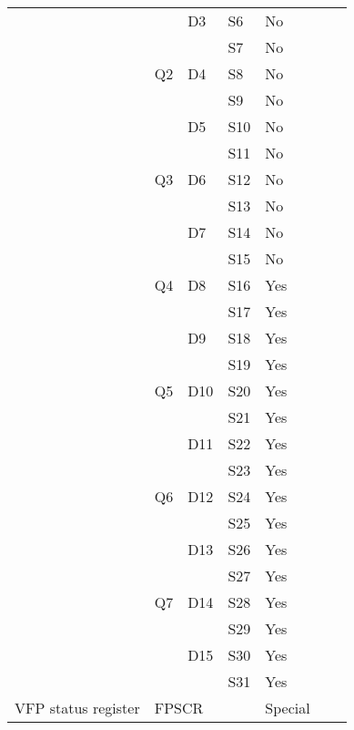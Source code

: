 \begin{tabular}{lllllll}
									&		&	D3	&	S6			&	No			&	  		\\
									&		&		&	S7			&	No			&	  		\\
									&	Q2	&	D4	&	S8			&	No			&	  		\\
									&		&		&	S9			&	No			&	  		\\
									&		&	D5	&	S10			&	No			&	  		\\
									&		&		&	S11			&	No			&	  		\\
									&	Q3	&	D6	&	S12			&	No			&	  		\\
									&		&		&	S13			&	No			&	  		\\
									&		&	D7	&	S14			&	No			&	  		\\
									&		&		&	S15			&	No			&	  		\\
									&	Q4	&	D8	&	S16			&	Yes			&	  		\\
									&		&		&	S17			&	Yes			&	  		\\
									&		&	D9	&	S18			&	Yes			&	  		\\
									&		&		&	S19			&	Yes			&	  		\\
									&	Q5	&	D10	&	S20			&	Yes			&	  		\\
									&		&		&	S21			&	Yes			&	  		\\
									&		&	D11	&	S22			&	Yes			&	  		\\
									&		&		&	S23			&	Yes			&	  		\\
									&	Q6	&	D12	&	S24			&	Yes			&	  		\\
									&		&		&	S25			&	Yes			&	  		\\
									&		&	D13	&	S26			&	Yes			&	  		\\
									&		&		&	S27			&	Yes			&	  		\\
									&	Q7	&	D14	&	S28			&	Yes			&	  		\\
									&		&		&	S29			&	Yes			&	  		\\
									&		&	D15	&	S30			&	Yes			&	  		\\
									&		&		&	S31			&	Yes			&	  		\\
		VFP status register			&	\multicolumn{3}{l}{FPSCR}	&	Special		&						 		\\
		\bottomrule
	\end{tabular}